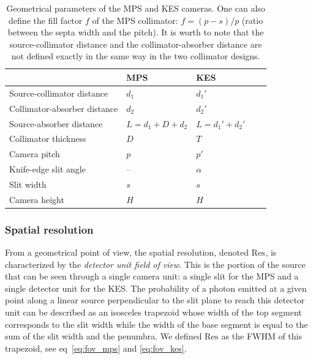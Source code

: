 \documentclass[a4paper,english,12pt]{article}
\begin{document}
\begin{table}[h]
\centering
\begin{tabular}{lllll}
	\midrule
																& MPS               & KES \\
	\midrule
	Source-collimator distance		& $d_1$             & $d_1'$ \\
 	Collimator-absorber distance	& $d_2$             & $d_2'$ \\
	Source-absorber distance			& $L=d_1+D+d_2$			& $L=d_1'+d_2'$\\
 	Collimator thickness 					& $D$               & $T$ \\
	Camera pitch									& $p$								& $p'$\\
	Knife-edge slit angle					& --								& $\alpha$\\	
	Slit width										& $s$ 							& $s$ \\ %
	Camera height									& $H$ 							& $H$ \\	
	\midrule
\end{tabular}
\caption{Geometrical parameters of the MPS and KES cameras. One can also define the fill factor $f$ of the MPS collimator: $f=(p-s)/p$ (ratio between the septa width and the pitch). It is worth to note that the source-collimator distance and the collimator-absorber distance are not defined exactly in the same way in the two collimator designs.}
\label{table:CamerasParameters}
\end{table}



\subsubsection{Spatial resolution}

\newcommand\FOV{\textrm{Res}}
\newcommand\MPS{\textrm{MPS}}
\newcommand\KES{\textrm{KES}}
\newcommand\du{}
\newcommand\DE{\textrm{Eff}}

From a geometrical point of view, the spatial resolution, denoted $\FOV_{\du}$, is characterized by the \textit{detector unit field of view}. This is the portion of
the source that can be seen through a single camera unit: a single slit for the MPS and a single detector unit for the KES. The probability of a photon emitted at a
given point along a linear source perpendicular to the slit plane to reach
this detector unit can be described as an isosceles trapezoid whose width of the top segment corresponds to the slit width while the width of the base segment is equal to the sum of the slit width and the penumbra. We defined $\FOV_{\du}$
as the FWHM of this trapezoid, see eq~\ref{eq:fov_mps} and \ref{eq:fov_kes}.
\end{document}
